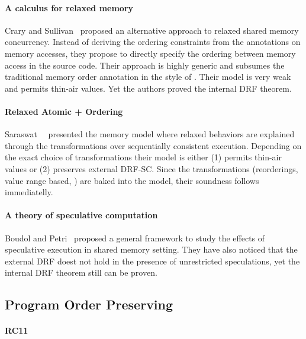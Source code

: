 \paragraph{A calculus for relaxed memory}

Crary and Sullivan~\cite{Crary-Sullivan:POPL15} proposed 
an alternative approach to relaxed shared memory concurrency.
Instead of deriving the ordering constraints from the annotations 
on memory accesses, they propose to directly specify 
the ordering between memory access in the source code. 
Their approach is highly generic and subsumes 
the traditional memory order annotation in the style of \CMM.
Their model is very weak and permits thin-air values. 
Yet the authors proved the internal DRF theorem.

\paragraph{Relaxed Atomic + Ordering}

Saraswat~\etal~\cite{Saraswat-al:PPoPP07} presented the \RAO memory model
where relaxed behaviors are explained through the transformations 
over sequentially consistent execution.
Depending on the exact choice of transformations 
their model is either (1) permits thin-air values or 
(2) preserves external DRF-SC. 
Since the transformations (\eg reorderings, value range based, \etc)
are baked into the model, their soundness follows immediatelly.  

\paragraph{A theory of speculative computation}

Boudol and Petri~\cite{Boudol-Petri:ESOP10} proposed a general 
framework to study the effects of speculative execution in
shared memory setting. 
They have also noticed that the external DRF doest not 
hold in the presence of unrestricted speculations, 
yet the internal DRF theorem still can be proven. 

\subsection{Program Order Preserving}
\label{sec:catalog:porf}

\paragraph{RC11}

